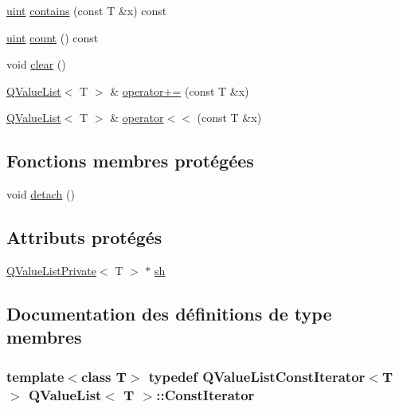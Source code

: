 \begin{DoxyCompactItemize}
\item 
\hyperlink{qglobal_8h_a4d3943ddea65db7163a58e6c7e8df95a}{uint} \hyperlink{class_q_value_list_a684f55687f6b82e3c4dd71e4ff3e2593}{contains} (const T \&x) const 
\item 
\hyperlink{qglobal_8h_a4d3943ddea65db7163a58e6c7e8df95a}{uint} \hyperlink{class_q_value_list_aabe7735bc70468e6f7273d85cccc65ab}{count} () const 
\item 
void \hyperlink{class_q_value_list_ac026366cf25ad91b6cbacf291a75b420}{clear} ()
\item 
\hyperlink{class_q_value_list}{Q\+Value\+List}$<$ T $>$ \& \hyperlink{class_q_value_list_a454d57e59775a62a6a05cec8ce019369}{operator+=} (const T \&x)
\item 
\hyperlink{class_q_value_list}{Q\+Value\+List}$<$ T $>$ \& \hyperlink{class_q_value_list_a2a037d16e790d81a5b1caea4d485ca09}{operator$<$$<$} (const T \&x)
\end{DoxyCompactItemize}
\subsection*{Fonctions membres protégées}
\begin{DoxyCompactItemize}
\item 
void \hyperlink{class_q_value_list_a8058c18bd44bd75b72947e2db636689b}{detach} ()
\end{DoxyCompactItemize}
\subsection*{Attributs protégés}
\begin{DoxyCompactItemize}
\item 
\hyperlink{class_q_value_list_private}{Q\+Value\+List\+Private}$<$ T $>$ $\ast$ \hyperlink{class_q_value_list_a98d0ae49f314645c094e61a1d2c1264c}{sh}
\end{DoxyCompactItemize}


\subsection{Documentation des définitions de type membres}
\hypertarget{class_q_value_list_a945cde34d45626792d1c5c8012b9b680}{}
\subsubsection[{Const\+Iterator}]{\setlength{\rightskip}{0pt plus 5cm}template$<$class T$>$ typedef {\bf Q\+Value\+List\+Const\+Iterator}$<$T$>$ {\bf Q\+Value\+List}$<$ T $>$\+::{\bf Const\+Iterator}}\label{class_q_value_list_a945cde34d45626792d1c5c8012b9b680}
\hypertarget{class_q_value_list_a043c8661906b45f062d493601804a5ea}{}
